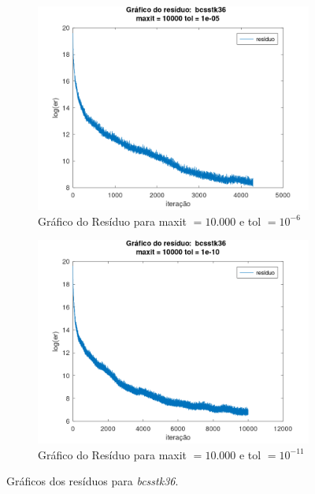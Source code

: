 \begin{figure}[H]
    \par\bigskip
    \begin{subfigure}[t]{0.4\linewidth}
         \centering
         \includegraphics[width=\textwidth]{image/bcsstk36_10000_-6.png}
         \caption{Gráfico do Resíduo para maxit $= 10.000$ e tol $=10^{-6}$}
         \label{fig:bcsstk36-10-6}
    \end{subfigure}
    \quad
    \begin{subfigure}[t]{0.4\linewidth}
         \centering
         \includegraphics[width=\textwidth]{image/bcsstk36_10000_-11.png}
         \caption{Gráfico do Resíduo para maxit $= 10.000$ e tol $=10^{-11}$}
         \label{fig:bcsstk36-10-11}
    \end{subfigure}
    \caption{Gráficos dos resíduos para \textit{bcsstk36}.}
    \label{fig:bcsstk36}
\end{figure}